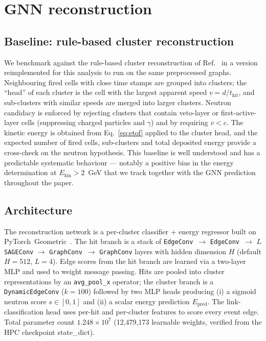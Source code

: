 \documentclass[aps,prc,twocolumn,superscriptaddress,showpacs,%
               nofootinbib,floatfix,longbibliography]{revtex4-2}
\newcommand{\Ekin}{E_{\text{kin}}}
\newcommand{\PyG}{PyTorch~Geometric}
\begin{document}
\section{GNN reconstruction}
\label{sec:gnn}

\subsection{Baseline: rule-based cluster reconstruction}
\label{sec:gnn:baseline}

We benchmark against the rule-based cluster reconstruction of
Ref.~\cite{Morozov2024HGND} in a version reimplemented for this
analysis to run on the same preprocessed graphs.  Neighbouring fired
cells with close time stamps are grouped into clusters; the ``head''
of each cluster is the cell with the largest apparent speed
$v = d/t_{\text{hit}}$, and sub-clusters with similar speeds are
merged into larger clusters.  Neutron candidacy is enforced by
rejecting clusters that contain veto-layer or first-active-layer cells
(suppressing charged particles and $\gamma$) and by requiring
$v < c$.  The kinetic energy is obtained from Eq.~\eqref{eq:etof}
applied to the cluster head, and the expected number of fired cells,
sub-clusters and total deposited energy provide a cross-check on the
neutron hypothesis.  This baseline is well understood and has a
predictable systematic behaviour --- notably a positive bias in the
energy determination at $\Ekin > 2$~GeV that we track together with
the GNN prediction throughout the paper.

\subsection{Architecture}

The reconstruction network is a per-cluster classifier + energy
regressor built on \PyG{}~\cite{FeyLenssen2019PyG,
KipfWelling2016GCN}.  The hit branch is
a stack of \texttt{EdgeConv}~$\to$ \texttt{EdgeConv}~$\to$ $L$
\texttt{SAGEConv} $\to$ \texttt{GraphConv}~$\to$ \texttt{GraphConv}
layers with hidden dimension $H$ (default $H=512$, $L=4$).  Edge
scores from the hit branch are learned via a two-layer MLP and used to
weight message passing.  Hits are pooled into cluster representations
by an \texttt{avg\_pool\_x} operator; the cluster branch is a
\texttt{DynamicEdgeConv} ($k=100$) followed by two MLP heads
producing (i) a sigmoid neutron score $s \in [0,1]$ and (ii) a scalar
energy prediction $E_{\text{pred}}$.  The link-classification head
uses per-hit and per-cluster features to score every event edge.
Total parameter count $1.248 \times 10^{7}$ (12{,}479{,}173
learnable weights, verified from the HPC checkpoint state\_dict).
\end{document}
